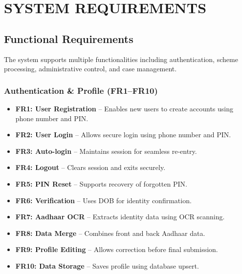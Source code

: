 \section{SYSTEM REQUIREMENTS}

\subsection{Functional Requirements}

The system supports multiple functionalities including authentication, scheme processing, administrative control, and case management.

\subsubsection{Authentication \& Profile (FR1--FR10)}
\begin{itemize}
    \item \textbf{FR1: User Registration} -- Enables new users to create accounts using phone number and PIN.
    \item \textbf{FR2: User Login} -- Allows secure login using phone number and PIN.
    \item \textbf{FR3: Auto-login} -- Maintains session for seamless re-entry.
    \item \textbf{FR4: Logout} -- Clears session and exits securely.
    \item \textbf{FR5: PIN Reset} -- Supports recovery of forgotten PIN.
    \item \textbf{FR6: Verification} -- Uses DOB for identity confirmation.
    \item \textbf{FR7: Aadhaar OCR} -- Extracts identity data using OCR scanning.
    \item \textbf{FR8: Data Merge} -- Combines front and back Aadhaar data.
    \item \textbf{FR9: Profile Editing} -- Allows correction before final submission.
    \item \textbf{FR10: Data Storage} -- Saves profile using database upsert.
\end{itemize}

